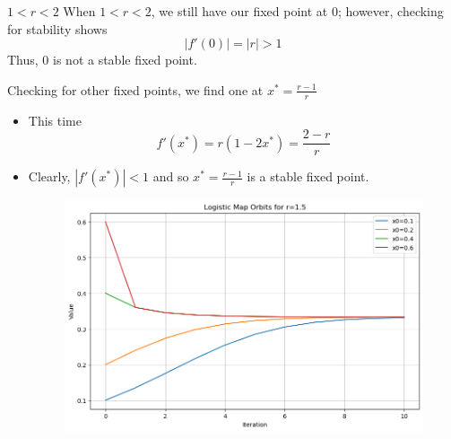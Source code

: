 \documentclass[
	11pt, %
]{beamer}
\begin{document}
\begin{frame}{$1 < r<2$}
When $1< r<2$, we still have our fixed point at 0; however, checking for stability shows
\[|f'(0)|=|r|> 1\]
Thus, $0$ is not a stable fixed point. 

Checking for other fixed points, we find one at $x^\ast=\frac{r-1}{r}$

\begin{itemize}
    \item This time
    \[f'(x^\ast)=r(1-2x^\ast)=\frac{2-r}{r}\]
    \item 
    Clearly, $|f'(x^\ast)|<1$ and so $x^\ast=\frac{r-1}{r}$ is a stable fixed point.
     	\begin{figure}
	\includegraphics[scale=0.25]{./figures/1lesrles2}
	\end{figure}
\end{itemize}
    
\end{frame}
\end{document}
